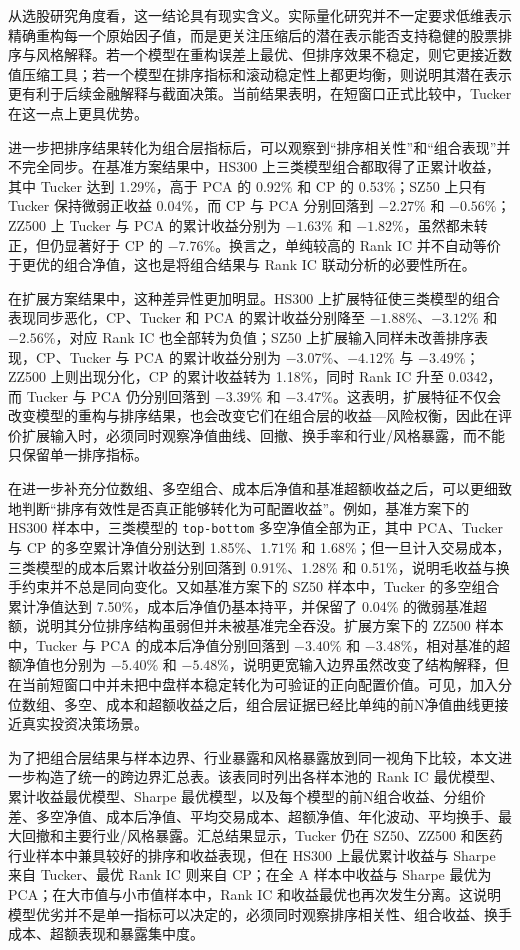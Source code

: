 从选股研究角度看，这一结论具有现实含义。实际量化研究并不一定要求低维表示精确重构每一个原始因子值，而是更关注压缩后的潜在表示能否支持稳健的股票排序与风格解释。若一个模型在重构误差上最优、但排序效果不稳定，则它更接近数值压缩工具；若一个模型在排序指标和滚动稳定性上都更均衡，则说明其潜在表示更有利于后续金融解释与截面决策。当前结果表明，在短窗口正式比较中，Tucker 在这一点上更具优势。

进一步把排序结果转化为组合层指标后，可以观察到“排序相关性”和“组合表现”并不完全同步。在基准方案结果中，HS300 上三类模型组合都取得了正累计收益，其中 Tucker 达到 1.29\%，高于 PCA 的 0.92\% 和 CP 的 0.53\%；SZ50 上只有 Tucker 保持微弱正收益 0.04\%，而 CP 与 PCA 分别回落到 $-2.27\%$ 和 $-0.56\%$；ZZ500 上 Tucker 与 PCA 的累计收益分别为 $-1.63\%$ 和 $-1.82\%$，虽然都未转正，但仍显著好于 CP 的 $-7.76\%$。换言之，单纯较高的 Rank IC 并不自动等价于更优的组合净值，这也是将组合结果与 Rank IC 联动分析的必要性所在。

在扩展方案结果中，这种差异性更加明显。HS300 上扩展特征使三类模型的组合表现同步恶化，CP、Tucker 和 PCA 的累计收益分别降至 $-1.88\%$、$-3.12\%$ 和 $-2.56\%$，对应 Rank IC 也全部转为负值；SZ50 上扩展输入同样未改善排序表现，CP、Tucker 与 PCA 的累计收益分别为 $-3.07\%$、$-4.12\%$ 与 $-3.49\%$；ZZ500 上则出现分化，CP 的累计收益转为 1.18\%，同时 Rank IC 升至 0.0342，而 Tucker 与 PCA 仍分别回落到 $-3.39\%$ 和 $-3.47\%$。这表明，扩展特征不仅会改变模型的重构与排序结果，也会改变它们在组合层的收益—风险权衡，因此在评价扩展输入时，必须同时观察净值曲线、回撤、换手率和行业/风格暴露，而不能只保留单一排序指标。

在进一步补充分位数组、多空组合、成本后净值和基准超额收益之后，可以更细致地判断“排序有效性是否真正能够转化为可配置收益”。例如，基准方案下的 HS300 样本中，三类模型的 \texttt{top-bottom} 多空净值全部为正，其中 PCA、Tucker 与 CP 的多空累计净值分别达到 1.85\%、1.71\% 和 1.68\%；但一旦计入交易成本，三类模型的成本后累计收益分别回落到 0.91\%、1.28\% 和 0.51\%，说明毛收益与换手约束并不总是同向变化。又如基准方案下的 SZ50 样本中，Tucker 的多空组合累计净值达到 7.50\%，成本后净值仍基本持平，并保留了 0.04\% 的微弱基准超额，说明其分位排序结构虽弱但并未被基准完全吞没。扩展方案下的 ZZ500 样本中，Tucker 与 PCA 的成本后净值分别回落到 $-3.40\%$ 和 $-3.48\%$，相对基准的超额净值也分别为 $-5.40\%$ 和 $-5.48\%$，说明更宽输入边界虽然改变了结构解释，但在当前短窗口中并未把中盘样本稳定转化为可验证的正向配置价值。可见，加入分位数组、多空、成本和超额收益之后，组合层证据已经比单纯的前N净值曲线更接近真实投资决策场景。

为了把组合层结果与样本边界、行业暴露和风格暴露放到同一视角下比较，本文进一步构造了统一的跨边界汇总表。该表同时列出各样本池的 Rank IC 最优模型、累计收益最优模型、Sharpe 最优模型，以及每个模型的前N组合收益、分组价差、多空净值、成本后净值、平均交易成本、超额净值、年化波动、平均换手、最大回撤和主要行业/风格暴露。汇总结果显示，Tucker 仍在 SZ50、ZZ500 和医药行业样本中兼具较好的排序和收益表现，但在 HS300 上最优累计收益与 Sharpe 来自 Tucker、最优 Rank IC 则来自 CP；在全 A 样本中收益与 Sharpe 最优为 PCA；在大市值与小市值样本中，Rank IC 和收益最优也再次发生分离。这说明模型优劣并不是单一指标可以决定的，必须同时观察排序相关性、组合收益、换手成本、超额表现和暴露集中度。

